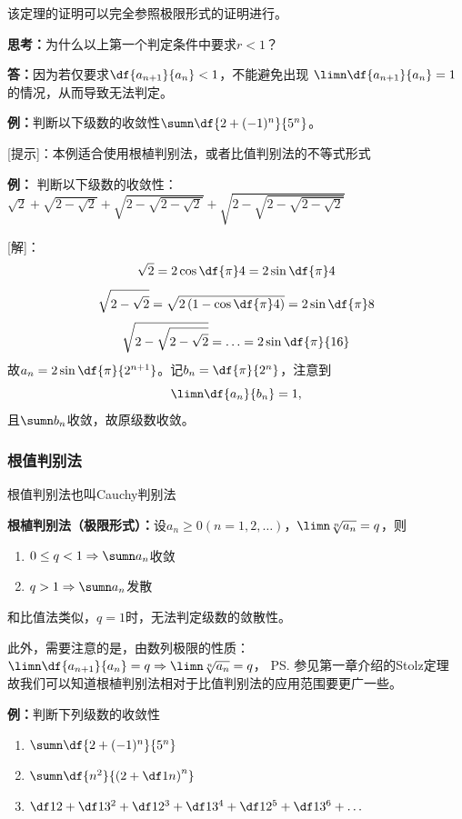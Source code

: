 该定理的证明可以完全参照极限形式的证明进行。

{\b {\bf 思考：}为什么以上第一个判定条件中要求$r<1$？

{\bf 答：}因为若仅要求$\df{a_{n+1}}{a_n}<1$，不能避免出现
$\limn\df{a_{n+1}}{a_n}=1$的情况，从而导致无法判定。}

{\bf 例：}判断以下级数的收敛性$\sumn\df{2+(-1)^n}{5^n}$。

[提示]：本例适合使用根植判别法，或者比值判别法的不等式形式

{\bf 例：} 判断以下级数的收敛性：$\sqrt2+\sqrt{2-\sqrt2}+\sqrt{2-\sqrt{2-\sqrt2}}
+\sqrt{2-\sqrt{2-\sqrt{2-\sqrt2}}}$

[解]：
$$\sqrt2=2\cos\df{\pi}4=2\sin\df{\pi}4$$
$$\sqrt{2-\sqrt2}=\sqrt{2\left(1-\cos\df{\pi}4\right)}=2\sin\df{\pi}8$$
$$\sqrt{2-\sqrt{2-\sqrt2}}=\ldots=2\sin\df{\pi}{16}$$
故$a_n=2\sin\df{\pi}{2^{n+1}}$。记$b_n=\df{\pi}{2^{n}}$，注意到
$$\limn\df{a_n}{b_n}=1,$$
且$\sumn b_n$收敛，故原级数收敛。\fin

\subsubsection{根值判别法}

根值判别法也叫{\kaishu Cauchy判别法}

\begin{thx}
	{\bf 根植判别法（极限形式）：}设$a_n\geq 0(n=1,2,\ldots)$，$\limn\sqrt[n]{a_n}=q$，则
	\begin{enumerate}
	  \setlength{\itemindent}{1cm}
	  \item $0\leq q<1\Rightarrow\sumn a_n$收敛
	  \item $q>1\Rightarrow\sumn a_n$发散
	\end{enumerate}
\end{thx}

和比值法类似，$q=1$时，无法判定级数的敛散性。

此外，需要注意的是，由数列极限的性质：
$\limn\df{a_{n+1}}{a_n}=q\Rightarrow\limn\sqrt[n]{a_n}=q$，
\ps{参见第一章介绍的Stolz定理}
故我们可以知道根植判别法相对于比值判别法的应用范围要更广一些。


{\bf 例：}判断下列级数的收敛性
\begin{enumerate} [(1)]
  \setlength{\itemindent}{1cm}
  \item $\sumn\df{2+(-1)^n}{5^n}$
  \item $\sumn\df{n^2}{\left(2+\df 1n\right)^n}$
  \item $\df 12+\df 1{3^2}+\df 1{2^3}+\df 1{3^4}+\df 1{2^5}+\df 1{3^6}+\ldots$
\end{enumerate}

